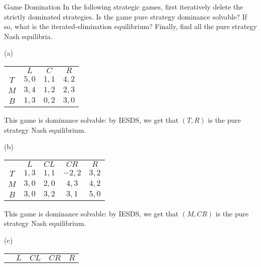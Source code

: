 \documentclass[10pt]{extarticle}
\begin{document}
  \begin{problem}{Game Domination}
    In the following strategic games, first iteratively delete the strictly dominated strategies. Is the game pure strategy dominance solvable? If so, what is the iterated-elimination equilibrium? Finally, find all the pure strategy Nash equilibria.
    \begin{problem}{(a)}
      \begin{center}
        \begin{tabular}{c|c|c|c|}
          \multicolumn{1}{c}{}&\multicolumn{1}{c}{$L$}&\multicolumn{1}{c}{$C$}&\multicolumn{1}{c}{$R$}\\
          \cline{2-4}
          $T$ & $5,0$ & $1,1$ & $4,2$ \\
          \cline{2-4}
          $M$ & $3,4$ & $1,2$ & $2,3$ \\
          \cline{2-4}
          $B$ & $1,3$ & $0,2$ & $3,0$\\
          \cline{2-4}
        \end{tabular}
      \end{center}
      \tcblower
      This game is dominance solvable: by IESDS, we get that $(T,R)$ is the pure strategy Nash equilibrium.
    \end{problem}
    \begin{problem}{(b)}
      \begin{center}
        \begin{tabular}{c|c|c|c|c|}
          \multicolumn{1}{c}{} & \multicolumn{1}{c}{$L$} & \multicolumn{1}{c}{$CL$} & \multicolumn{1}{c}{$CR$} & \multicolumn{1}{c}{$R$}\\
          \cline{2-5}
          $T$ & $1,3$ & $1,1$ & $-2,2$ & $3,2$\\
          \cline{2-5}
          $M$ & $3,0$ & $2,0$ & $4,3$ & $4,2$ \\
          \cline{2-5}
          $B$ & $3,0$ & $3,2$ & $3,1$ & $5,0$\\
          \cline{2-5}
        \end{tabular}
      \end{center}
      \tcblower
      This game is dominance solvable: by IESDS, we get that $(M,CR)$ is the pure strategy Nash equilibrium.
    \end{problem}
    \begin{problem}{(c)}
      \begin{center}
        \begin{tabular}{c|c|c|c|c|}
          \multicolumn{1}{c}{} & \multicolumn{1}{c}{$L$} & \multicolumn{1}{c}{$CL$} & \multicolumn{1}{c}{$CR$} & \multicolumn{1}{c}{$R$}\\

\end{tabular}
\end{center}
\end{problem}
\end{problem}
\end{document}
